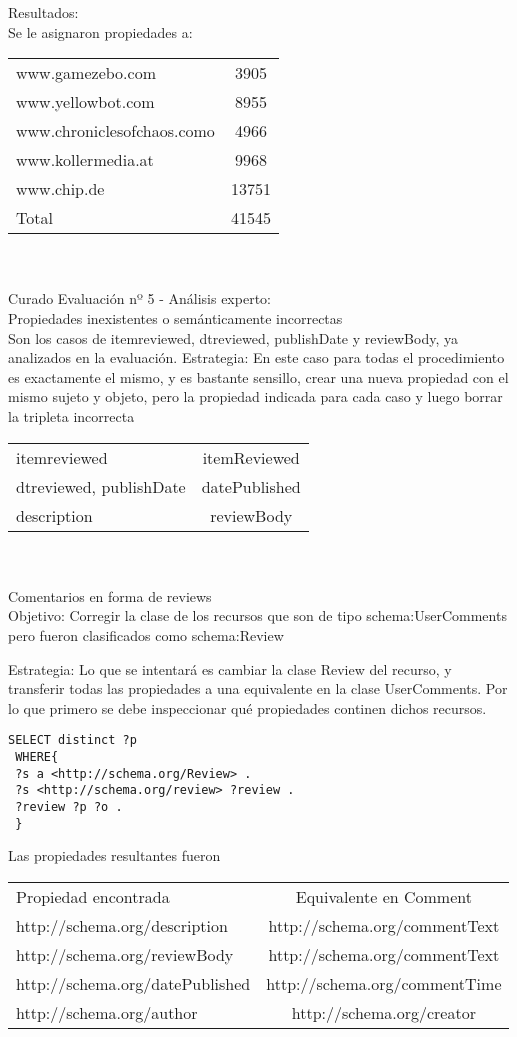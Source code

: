 Resultados:\\
Se le asignaron propiedades a:\\
\begin{tabular}{| l | c |}
 www.gamezebo.com & 3905\\
 www.yellowbot.com & 8955\\
 www.chroniclesofchaos.como & 4966\\
 www.kollermedia.at & 9968\\
 www.chip.de & 13751\\
 Total & 41545
\end{tabular}\\
\\
Curado Evaluación nº 5 - Análisis experto:
\\
Propiedades inexistentes o semánticamente incorrectas\\
Son los casos de itemreviewed, dtreviewed, publishDate y reviewBody, ya analizados en la evaluación.
Estrategia: En este caso para todas el procedimiento es exactamente el mismo, y es bastante sensillo, crear una nueva propiedad con 
el mismo sujeto y objeto, pero la propiedad indicada para cada caso y luego borrar la tripleta incorrecta\\
\begin{tabular}{| l | c |}
 itemreviewed & itemReviewed\\
 dtreviewed, publishDate & datePublished\\
 description & reviewBody
\end{tabular}\\
\\

Comentarios en forma de reviews\\
Objetivo:
Corregir la clase de los recursos que son de tipo schema:UserComments pero fueron clasificados como schema:Review

Estrategia: 
Lo que se intentará es cambiar la clase Review del recurso, y transferir todas las propiedades a una equivalente en la clase UserComments.
Por lo que primero se debe inspeccionar qué propiedades continen dichos recursos.

\begin{lstlisting}[frame=single]
 SELECT distinct ?p
 WHERE{
 ?s a <http://schema.org/Review> .
 ?s <http://schema.org/review> ?review .
 ?review ?p ?o .
 }
\end{lstlisting}
Las propiedades resultantes fueron\\
\begin{tabular}{| l | c |}
Propiedad encontrada & Equivalente en Comment\\
http://schema.org/description & http://schema.org/commentText \\
http://schema.org/reviewBody & http://schema.org/commentText \\
http://schema.org/datePublished & http://schema.org/commentTime \\
http://schema.org/author & http://schema.org/creator
\end{tabular}

